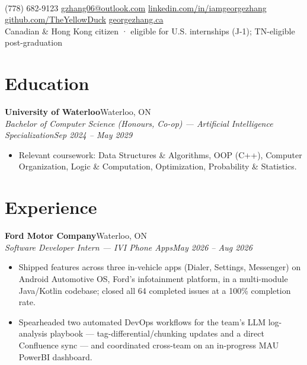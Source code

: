 \documentclass[letterpaper,11pt]{article}
\newcommand{\sep}{\hspace{0.5em}\textcolor{accent!55}{\textbar}\hspace{0.5em}}
\newcommand{\entry}[4]{%
  \textbf{#1}\hfill{\small #2}\\[1pt]%
  {\small\itshape #3}\hfill{\small\itshape #4}\par%
}
\newenvironment{bullets}
  {\begin{itemize}[leftmargin=1.5em,labelsep=0.5em,itemsep=1pt,topsep=1pt,parsep=0pt,partopsep=0pt]\small}
  {\end{itemize}\vspace{1pt}}
\begin{document}
\begin{center}
  {\Huge\bfseries\color{accent}}\\[5pt]
  {\footnotesize
  (778) 682-9123 \sep
  \href{mailto:gzhang06@outlook.com}{gzhang06@outlook.com} \sep
  \href{https://linkedin.com/in/iamgeorgezhang}{linkedin.com/in/iamgeorgezhang} \sep
  \href{https://github.com/TheYellowDuck}{github.com/TheYellowDuck} \sep
  \href{https://georgezhang.ca}{georgezhang.ca}
  \\[3pt]Canadian \& Hong Kong citizen \; · \; eligible for U.S. internships (J-1); TN-eligible post-graduation}
\end{center}

\section{Education}
\entry{University of Waterloo}{Waterloo, ON}{Bachelor of Computer Science (Honours, Co-op) --- Artificial Intelligence Specialization}{Sep 2024 -- May 2029}
\begin{bullets}
  \item Relevant coursework: Data Structures \& Algorithms, OOP (C++), Computer Organization, Logic \& Computation, Optimization, Probability \& Statistics.
\end{bullets}

\section{Experience}

\entry{Ford Motor Company}{Waterloo, ON}{Software Developer Intern --- IVI Phone Apps}{May 2026 -- Aug 2026}
\begin{bullets}
  \item Shipped features across three in-vehicle apps (Dialer, Settings, Messenger) on Android Automotive OS, Ford's infotainment platform, in a multi-module Java/Kotlin codebase; closed all 64 completed issues at a 100\% completion rate.
  \item Spearheaded two automated DevOps workflows for the team's LLM log-analysis playbook --- tag-differential/chunking updates and a direct Confluence sync --- and coordinated cross-team on an in-progress MAU PowerBI dashboard.
\end{bullets}
\end{document}

